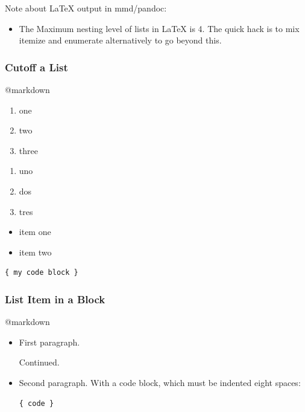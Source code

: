 \documentclass[]{article}
\providecommand{\tightlist}{%
  \setlength{\itemsep}{0pt}\setlength{\parskip}{0pt}}
\begin{document}
Note about LaTeX output in mmd/pandoc:

\begin{itemize}
\tightlist
\item
  The Maximum nesting level of lists in LaTeX is 4. The quick hack is to
  mix itemize and enumerate alternatively to go beyond this.
\end{itemize}

\subsubsection{Cutoff a List}\label{cutoff-a-list}

@markdown

\begin{enumerate}
\def\labelenumi{\arabic{enumi}.}
\tightlist
\item
  one
\item
  two
\item
  three
\end{enumerate}

\begin{enumerate}
\def\labelenumi{\arabic{enumi}.}
\tightlist
\item
  uno
\item
  dos
\item
  tres
\end{enumerate}

\begin{itemize}
\tightlist
\item
  item one
\item
  item two
\end{itemize}

\begin{verbatim}
{ my code block }
\end{verbatim}

\subsubsection{List Item in a Block}\label{list-item-in-a-block}

@markdown

\begin{itemize}
\item
  First paragraph.

  Continued.
\item
  Second paragraph. With a code block, which must be indented eight
  spaces:

\begin{verbatim}
{ code }
\end{verbatim}
\end{itemize}
\end{document}
